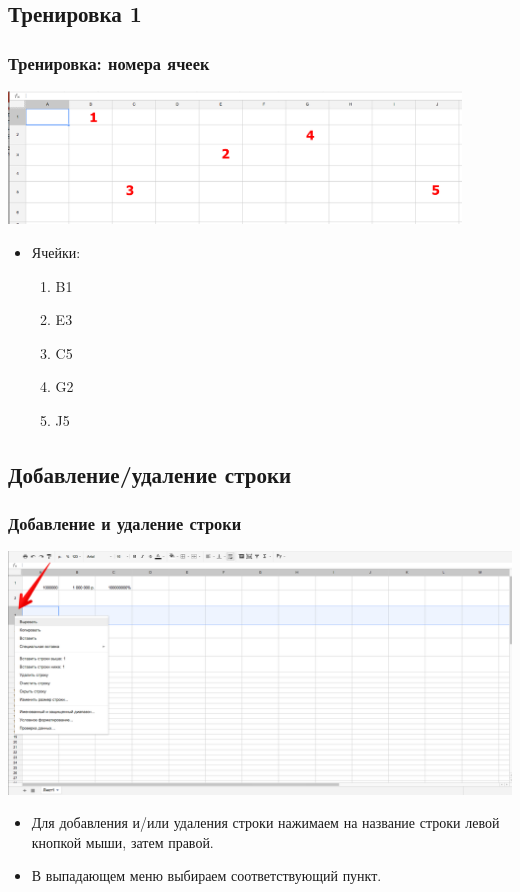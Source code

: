 \documentclass[compress,red]{beamer}
\begin{document}
\subsection{Тренировка 1}
\begin{frame}[fragile]
  \frametitle{Тренировка: номера ячеек}
  \centerline{\includegraphics[width=0.9\textwidth]{images/03.png}}
  \begin{itemize}[<+->]
      \item Ячейки:
      \begin{enumerate}[<+->]
          \item B1
          \item E3
          \item C5
          \item G2
          \item J5
      \end{enumerate}
  \end{itemize}
\end{frame}

\subsection{Добавление/удаление строки}
\begin{frame}[fragile]
  \frametitle{Добавление и удаление строки}
  \centerline{\includegraphics[width=1.0\textwidth]{images/05.png}}
  \begin{itemize}
      \item Для добавления и/или удаления строки нажимаем на название строки левой кнопкой мыши, затем правой.
      \item В выпадающем меню выбираем соответствующий пункт.
  \end{itemize}
\end{frame}
\end{document}
